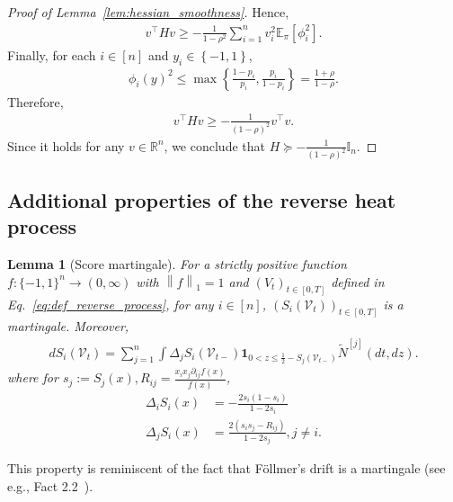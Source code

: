 \documentclass[11pt]{article}
\newcommand{\uV}{V}
\newcommand{\rV}{\mathscr{V}}
\newcommand{\wNj}{\widetilde{N}^{[j]}}
\theoremstyle{named}
\theoremstyle{plain}
\newtheorem{lemma}{Lemma}
\newcommand{\defn}{:=}
\newcommand{\real}{\ensuremath{\mathbb{R}}}
\newcommand{\Ind}{\ensuremath{\mathbb{I}}}
\newcommand{\Exs}{\ensuremath{{\mathbb{E}}}}
\newcommand{\braces}[1]{\left\{ #1 \right \}}
\newcommand{\tp}{^\top}
\newcommand{\vecnorm}[2]{\left\| #1\right\|_{#2}}
\begin{document}
\begin{proof}[Proof of Lemma~\ref{lem:hessian_smoothness}]
Hence,
\begin{align*}
  v \tp H v \geq - \frac{1}{1-\rho^2} \sum_{i=1}^n v_i^2 \Exs_\pi[\phi_i^2].
\end{align*}
Finally, for each $i \in [n]$ and $y_i \in \braces{-1,1}$, 
\begin{align*}
  \phi_i(y)^2 \leq \max\braces{\frac{1-p_i}{p_i}, \frac{p_i}{1-p_i}} = \frac{1+\rho}{1-\rho}.
\end{align*}
Therefore,
\begin{align*}
  v \tp H v \geq - \frac{1}{(1-\rho)^2} v\tp v. 
\end{align*}
Since it holds for any $v \in \real^n$, we conclude that $H \succeq -\frac{1}{(1-\rho)^2} \Ind_n$.
\end{proof}

\subsection{Additional properties of the reverse heat process}
\begin{lemma}[Score martingale]
  \label{lem:score_martingale}
  For a strictly positive function $f : \{-1,1\}^n \to (0,\infty)$ with $\vecnorm{f}{1} = 1$ and $(\uV_t)_{t \in [0, T]}$ defined in Eq.~\eqref{eq:def_reverse_process}, for any $i \in [n]$, $(S_i(\rV_t))_{t \in [0, T]}$ is a martingale. Moreover,
  \begin{align*}
    d S_i (\rV_t) = \sum_{j=1}^n \int \Delta_j S_i (\rV_{t-}) \mathbf{1}_{0 < z \leq \frac12 - S_j(\rV_{t-})} \wNj(dt, dz). 
  \end{align*}
  where for $s_j \defn S_j(x), R_{ij} = \frac{x_i x_j \partial_{ij} f (x)}{f(x)}$,
  \begin{align*}
    \Delta_i S_i (x) &= - \frac{2s_i (1-s_i)}{1-2s_i} \\
    \Delta_j S_i (x) &= \frac{2(s_i s_j - R_{ij})}{1-2s_j}, j \neq i.
  \end{align*}
\end{lemma}
This property is reminiscent of the fact that F\"ollmer's drift is a martingale (see e.g., Fact 2.2~\cite{eldan2018regularization}). 
\end{document}
